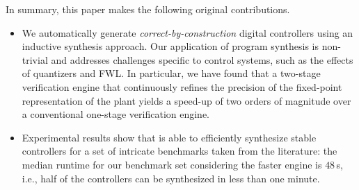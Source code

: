 \documentclass[final]{sig-alternate-05-2015}
\begin{document}
In summary, this paper makes the following original contributions.
%
\begin{itemize}

\item We automatically generate {\em correct-by-construction} digital
  controllers using an inductive synthesis approach.  Our application of program
  synthesis is non-trivial and addresses challenges specific to control
  systems, such as the effects of quantizers and FWL.  In particular, we
  have found that a two-stage verification engine that continuously refines
  the precision of the fixed-point representation of the plant yields a
  speed-up of two orders of magnitude over a conventional one-stage
  verification engine.

\item Experimental results show that \tool is able to efficiently synthesize
  stable controllers for a set of intricate benchmarks taken from the
  literature: the median runtime for our benchmark set considering the faster 
	engine is $48$\,s, i.e., half of the controllers can be synthesized in less than one minute.



\end{itemize}


\end{document}

